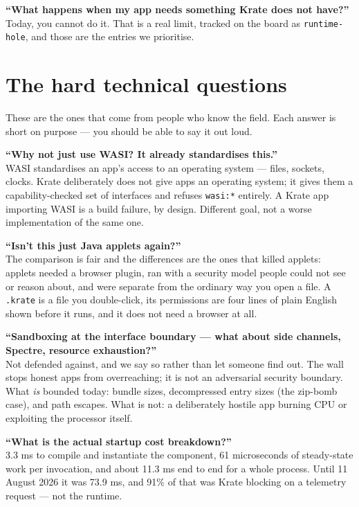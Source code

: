 \documentclass[11pt,a4paper]{report}
\begin{document}
\textbf{``What happens when my app needs something Krate does not have?''}\\
Today, you cannot do it. That is a real limit, tracked on the board as
\texttt{runtime-hole}, and those are the entries we prioritise.

\section{The hard technical questions}

These are the ones that come from people who know the field. Each answer is
short on purpose --- you should be able to say it out loud.

\textbf{``Why not just use WASI? It already standardises this.''}\\
WASI standardises an app's access to an operating system --- files,
sockets, clocks. Krate deliberately does not give apps an operating system;
it gives them a capability-checked set of interfaces and refuses
\texttt{wasi:*} entirely. A Krate app importing WASI is a build failure, by
design. Different goal, not a worse implementation of the same one.

\textbf{``Isn't this just Java applets again?''}\\
The comparison is fair and the differences are the ones that killed
applets: applets needed a browser plugin, ran with a security model people
could not see or reason about, and were separate from the ordinary way you
open a file. A \texttt{.krate} is a file you double-click, its permissions
are four lines of plain English shown before it runs, and it does not need
a browser at all.

\textbf{``Sandboxing at the interface boundary --- what about side
channels, Spectre, resource exhaustion?''}\\
Not defended against, and we say so rather than let someone find out. The
wall stops honest apps from overreaching; it is not an adversarial security
boundary. What \emph{is} bounded today: bundle sizes, decompressed entry
sizes (the zip-bomb case), and path escapes. What is not: a deliberately
hostile app burning CPU or exploiting the processor itself.

\textbf{``What is the actual startup cost breakdown?''}\\
3.3 ms to compile and instantiate the component, 61 microseconds of
steady-state work per invocation, and about 11.3 ms end to end for a whole
process. Until 11 August 2026 it was 73.9 ms, and 91\% of that was Krate
blocking on a telemetry request --- not the runtime.
\end{document}
